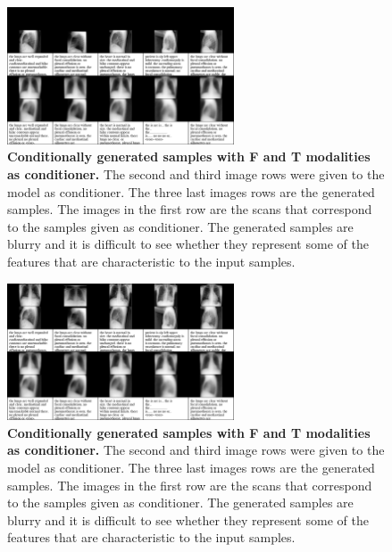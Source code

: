     \begin{frame}
            \begin{figure}
            \centering
            \includegraphics[width=0.6\textwidth, height = \textheight, keepaspectratio]{data/cond_gen/Lateral_text_censored}
                \caption{\tiny{
        \textbf{Conditionally generated samples with F and T modalities as conditioner.} The second and third image rows were given to the model as conditioner. The three last images rows are the generated samples. The images in the first row are the scans that correspond to the samples given as conditioner. The generated samples are blurry and it is difficult to see whether they represent some of the features that are characteristic to the input samples.
    }}
    \end{figure}
    \pause
    \begin{figure}
            \centering
            \includegraphics[width=0.6\textwidth, height = \textheight, keepaspectratio]{data/cond_gen/Lateral_text}
                \caption{\tiny{
        \textbf{Conditionally generated samples with F and T modalities as conditioner.} The second and third image rows were given to the model as conditioner. The three last images rows are the generated samples. The images in the first row are the scans that correspond to the samples given as conditioner. The generated samples are blurry and it is difficult to see whether they represent some of the features that are characteristic to the input samples.
    }}
        \end{figure}
    \end{frame}

